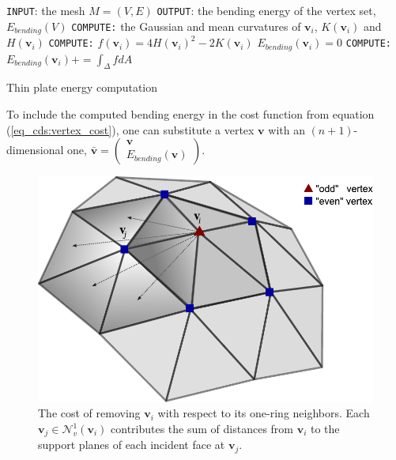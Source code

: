 \documentclass[graybox]{svmult}
\begin{document}
	\begin{algorithm}[t]
		\begin{algorithmic}
			\STATE \texttt{INPUT}: the mesh $M=(V,E)$
			\STATE \texttt{OUTPUT}: the bending energy of the vertex set, $E_{bending}(V)$
			\STATE \texttt{COMPUTE:} the Gaussian and mean curvatures of $\mathbf{v}_i$,
			$K(\mathbf{{v}}_i)$ and $H(\mathbf{{v}}_i)$
			\STATE \texttt{COMPUTE:} $f(\mathbf{v}_i) = 4H(\mathbf{{v}}_i)^2 - 2K(\mathbf{{v}}_i)$ 
			\ENDFOR
			\STATE $E_{bending}(\mathbf{{v}}_i) = 0$
			\STATE \texttt{COMPUTE:} $E_{bending}(\mathbf{v}_i) += \int_{\Delta }{f}dA$
			\ENDFOR
			\ENDFOR
		\end{algorithmic}
		\caption{Thin plate energy computation}
		\label{alg_cds:thin_plate_energy}
	\end{algorithm}
	To include the computed bending energy in the cost function from equation (\ref{eq_cds:vertex_cost}), one can substitute a vertex $\mathbf{v}$ with an $(n+1)$-dimensional one, $\mathbf{\bar{v}}=\begin{pmatrix}\mathbf{v} \\ E_{bending}(\mathbf{v})\end{pmatrix}$.
	
	\begin{figure}[t]
		\centering
		\includegraphics[width=.8\linewidth]{one-RingCost.pdf}
		\caption{\label{fig_cds:oneRingCost}
			The cost of removing $\mathbf{v}_i$ with respect to its one-ring neighbors. Each $\mathbf{v}_j \in \mathcal{N}_v^1(\mathbf{v}_i)$ contributes
			the sum of distances from $\mathbf{v}_i$ to the support planes of each incident face at $\mathbf{v}_j$.}
	\end{figure}
	
\end{document}
